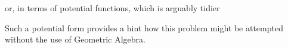 or, in terms of potential functions, which is arguably tidier


Such a potential form provides a hint how this problem might be attempted without the use of Geometric Algebra.
